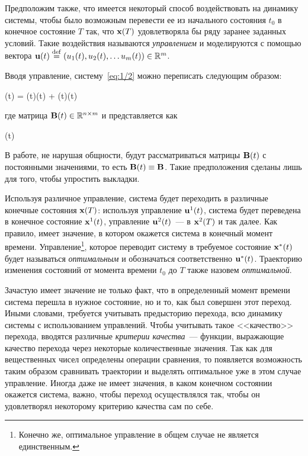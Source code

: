 Предположим также, что имеется некоторый способ воздействовать на динамику системы, чтобы было возможным перевести ее из начального состояния $t_0$ в конечное состояние $T$ так, что $\mathbf{x}(T)$ удовлетворяла бы ряду заранее заданных условий. Такие воздействия называются \emph{управлением} и моделируются с помощью вектора $\mathbf{u}(t) \stackrel{ \mathrm{def} }{=} (u_1(t), u_2(t), \ldots u_m(t)) \in \mathbb{R}^{m}$.

Вводя управление, систему~\ref{eq:1/2} можно переписать следующим образом:

	(t) = (t)(t) + (t)(t) \text{,}
\eeq

где матрица $\mathbf{B}(t) \in \mathbb{R}^{{n} \times {m}}$ и представляется как

\beqn
	(t) \eqdef {} 
\eeqn

В работе, не нарушая общности, будут рассматриваться матрицы $\mathbf{B}(t)$ с постоянными значениями, то есть $\mathbf{B}(t) \equiv \mathbf{B}$. Такие предположения сделаны лишь для того, чтобы упростить выкладки.

Используя различное управление, система будет переходить в различные конечные состояния $\mathbf{x}(T)$: используя управление $\mathbf{u}^1(t)$, система будет переведена в конечное состояние $\mathbf{x}^1(t)$, управление $\mathbf{u}^2(t)$~--- в $\mathbf{x}^2(T)$ и так далее. Как правило, имеет значение, в котором окажется система в конечный момент времени. Управление\footnote{Конечно же, оптимальное управление в общем случае не является единственным.}, которое переводит систему в требуемое состояние $\mathbf{x}^{*}(t)$ будет называться \emph{оптимальным} и обозначаться соответственно $\mathbf{u}^{*}(t)$. Траекторию изменения состояний от момента времени $t_0$ до $T$ также назовем \emph{оптимальной}.

\br

Зачастую имеет значение не только факт, что в определенный момент времени система перешла в нужное состояние, но и то, как был совершен этот переход. Иными словами, требуется учитывать предысторию перехода, всю динамику системы с использованием управлений. Чтобы учитывать такое <<качество>> перехода, вводятся различные \emph{критерии качества}~--- функции, выражающие качество перехода через некоторые количественные значения. Так как для вещественных чисел определены операции сравнения, то появляется возможность таким образом сравнивать траектории и выделять оптимальное уже в этом случае управление. Иногда даже не имеет значения, в каком конечном состоянии окажется система, важно, чтобы переход осуществлялся так, чтобы он удовлетворял некоторому критерию качества сам по себе.


